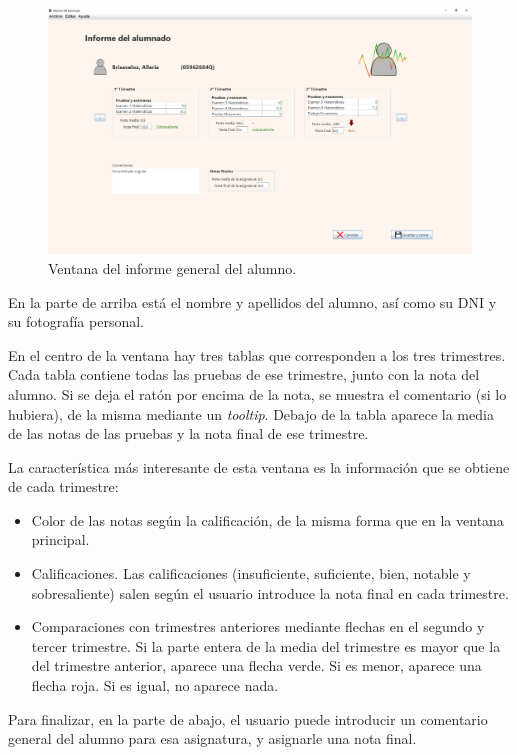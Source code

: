 \begin{figure}[h]
\centering\includegraphics[width=1\linewidth]{figs/informealumno.png}
\caption{Ventana del informe general del alumno.}
\label{Fig:informealumno}
\end{figure}

En la parte de arriba está el nombre y apellidos del alumno, así como su DNI y su fotografía personal.

En el centro de la ventana hay tres tablas que corresponden a los tres trimestres. Cada tabla contiene todas las pruebas de ese trimestre, junto con la nota del alumno. Si se deja el ratón por encima de la nota, se muestra el comentario (si lo hubiera), de la misma mediante un \textit{tooltip}. Debajo de la tabla aparece la media de las notas de las pruebas y la nota final de ese trimestre.

La característica más interesante de esta ventana es la información que se obtiene de cada trimestre:
\begin{itemize}
	\item{Color de las notas según la calificación,} de la misma forma que en la ventana principal.
	\item{Calificaciones}. Las calificaciones (insuficiente, suficiente, bien, notable y sobresaliente) salen según el usuario introduce la nota final en cada trimestre.
	\item{Comparaciones con trimestres anteriores} mediante flechas en el segundo y tercer trimestre. Si la parte entera de la media del trimestre es mayor que la del trimestre anterior, aparece una flecha verde. Si es menor, aparece una flecha roja. Si es igual, no aparece nada.
\end{itemize}

Para finalizar, en la parte de abajo, el usuario puede introducir un comentario general del alumno para esa asignatura, y asignarle una nota final.

